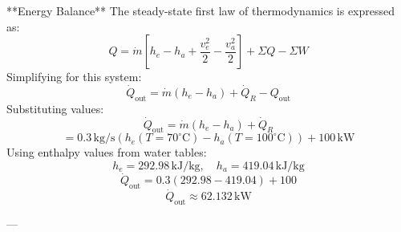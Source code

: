 **Energy Balance**  
The steady-state first law of thermodynamics is expressed as:  
\[
Q = \dot{m} \left[ h_e - h_a + \frac{v_e^2}{2} - \frac{v_a^2}{2} \right] + \Sigma Q - \Sigma W
\]  
Simplifying for this system:  
\[
\dot{Q}_{\text{out}} = \dot{m} \left( h_e - h_a \right) + \dot{Q}_R - Q_{\text{out}}
\]  
Substituting values:  
\[
\dot{Q}_{\text{out}} = \dot{m} \left( h_e - h_a \right) + \dot{Q}_R
\]  
\[
= 0.3 \, \text{kg/s} \left( h_e(T = 70^\circ\text{C}) - h_a(T = 100^\circ\text{C}) \right) + 100 \, \text{kW}
\]  
Using enthalpy values from water tables:  
\[
h_e = 292.98 \, \text{kJ/kg}, \quad h_a = 419.04 \, \text{kJ/kg}
\]  
\[
\dot{Q}_{\text{out}} = 0.3 \left( 292.98 - 419.04 \right) + 100
\]  
\[
\dot{Q}_{\text{out}} \approx 62.132 \, \text{kW}
\]  

---
